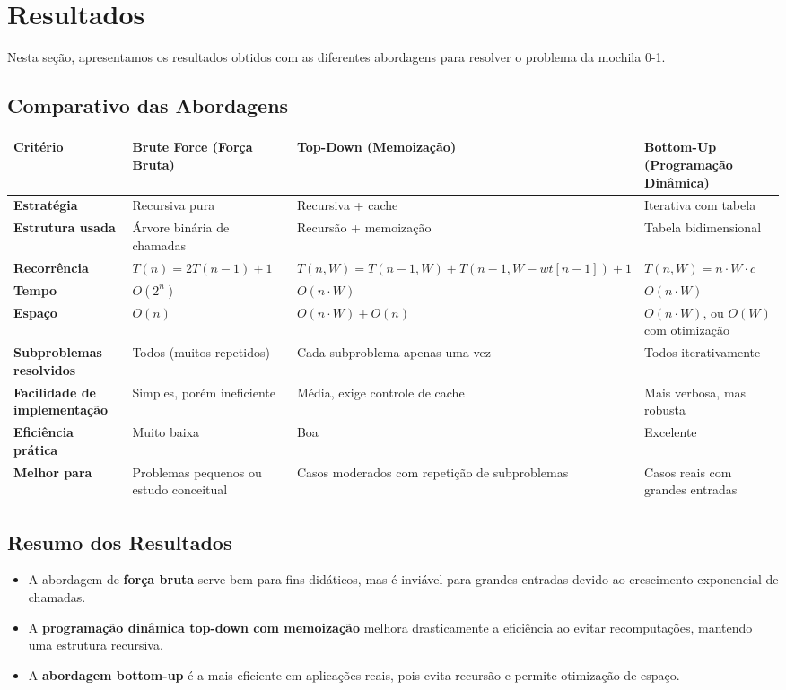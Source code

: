 \section{Resultados}
Nesta seção, apresentamos os resultados obtidos com as diferentes abordagens para resolver o problema da mochila 0-1.


\subsection*{Comparativo das Abordagens}

\begin{center}
\renewcommand{\arraystretch}{1.4}
\begin{tabular}{>{\bfseries}p{4cm} p{3.5cm} p{3.5cm} p{3.5cm}}
\toprule
Critério & Brute Force (Força Bruta) & Top-Down (Memoização) & Bottom-Up (Programação Dinâmica) \\
\midrule
Estratégia & Recursiva pura & Recursiva + cache & Iterativa com tabela \\
Estrutura usada & Árvore binária de chamadas & Recursão + memoização & Tabela bidimensional \\
Recorrência & \(T(n) = 2T(n-1) + 1\) & \(T(n, W) = T(n-1, W) + T(n-1, W - wt[n-1]) + 1\) & \(T(n, W) = n \cdot W \cdot c\) \\
Tempo & \(O(2^n)\) & \(O(n \cdot W)\) & \(O(n \cdot W)\) \\
Espaço & \(O(n)\) & \(O(n \cdot W) + O(n)\) & \(O(n \cdot W)\), ou \(O(W)\) com otimização \\
Subproblemas resolvidos & Todos (muitos repetidos) & Cada subproblema apenas uma vez & Todos iterativamente \\
Facilidade de implementação & Simples, porém ineficiente & Média, exige controle de cache & Mais verbosa, mas robusta \\
Eficiência prática & Muito baixa & Boa & Excelente \\
Melhor para & Problemas pequenos ou estudo conceitual & Casos moderados com repetição de subproblemas & Casos reais com grandes entradas \\
\bottomrule
\end{tabular}
\end{center}

\subsection*{Resumo dos Resultados}

\begin{itemize}
    \item A abordagem de \textbf{força bruta} serve bem para fins didáticos, mas é inviável para grandes entradas devido ao crescimento exponencial de chamadas.
    \item A \textbf{programação dinâmica top-down com memoização} melhora drasticamente a eficiência ao evitar recomputações, mantendo uma estrutura recursiva.
    \item A \textbf{abordagem bottom-up} é a mais eficiente em aplicações reais, pois evita recursão e permite otimização de espaço.
\end{itemize}

